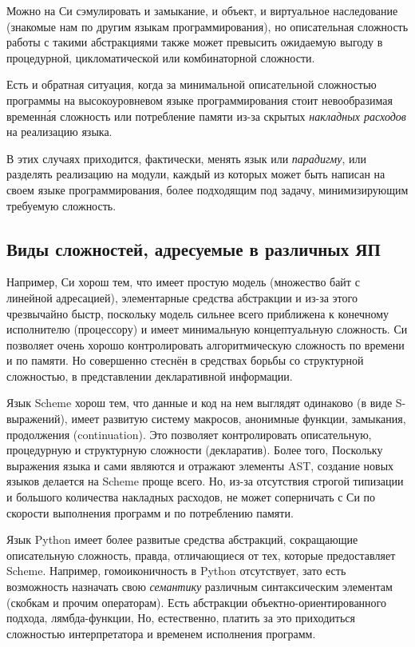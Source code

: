 \documentclass[10pt]{report}
\begin{document}
Можно на Си сэмулировать и замыкание, и объект, и виртуальное наследование (знакомые нам по другим языкам программирования), но описательная сложность работы с такими абстракциями также может превысить ожидаемую выгоду в процедурной, цикломатической или комбинаторной сложности.

Есть и обратная ситуация, когда за минимальной описательной сложностью программы на высокоуровневом языке программирования стоит невообразимая временн\'ая сложность или потребление памяти из-за скрытых {\em накладных расходов} на реализацию языка.

В этих случаях приходится, фактически, менять язык или {\em парадигму}, или разделять реализацию на модули, каждый из которых может быть написан на своем языке программирования, более подходящим под задачу, минимизирующим требуемую сложность.

\subsection{Виды сложностей, адресуемые в различных ЯП}
Например, Си хорош тем, что имеет простую модель (множество байт с линейной адресацией), элементарные средства абстракции и из-за этого чрезвычайно быстр, поскольку модель сильнее всего приближена к конечному исполнителю (процессору) и имеет минимальную концептуальную сложность.
Си позволяет очень хорошо контролировать алгоритмическую сложность по времени и по памяти. Но совершенно стеснён в средствах борьбы со структурной сложностью, в представлении декларативной информации.

Язык Scheme хорош тем, что данные и код на нем выглядят одинаково (в виде S-выражений), имеет развитую систему макросов, анонимные функции, замыкания, продолжения (continuation). Это позволяет контролировать описательную, процедурную и структурную сложности (декларатив).
Более того, Поскольку выражения языка и сами являются и отражают элементы AST, создание новых языков делается на Scheme проще всего.
Но, из-за отсутствия строгой типизации и большого количества накладных расходов, не может соперничать с Си по скорости выполнения программ и по потреблению памяти.
 
Язык Python имеет более развитые средства абстракций, сокращающие описательную сложность, правда, отличающиеся от тех, которые предоставляет Scheme. Например, гомоиконичность в Python отсутствует, зато есть возможность назначать свою {\em семантику} различным синтаксическим элементам (скобкам и прочим операторам).
Есть абстракции объектно-ориентированного подхода, лямбда-функции, 
Но, естественно, платить за это приходиться сложностью  интерпретатора и временем исполнения программ.
\end{document}
